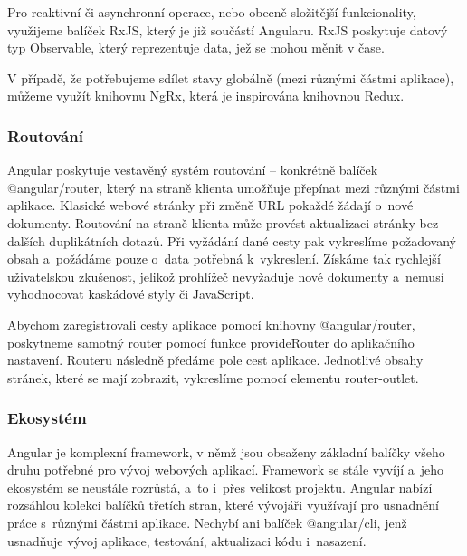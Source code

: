 Pro reaktivní či asynchronní operace, nebo obecně složitější funkcionality, využijeme balíček RxJS, který je již součástí Angularu. 
RxJS poskytuje datový typ Observable, který reprezentuje data, jež se mohou měnit v čase.\cite{angulario,rxjslibrary}

V případě, že potřebujeme sdílet stavy globálně (mezi různými částmi aplikace), můžeme využít knihovnu NgRx, která je inspirována knihovnou Redux.\cite{angularstatemanagement,ngrxlib}

\subsubsection{Routování}

Angular poskytuje vestavěný systém routování -- konkrétně balíček @angular/router, který na straně klienta umožňuje přepínat mezi různými částmi aplikace. 
Klasické webové stránky při změně URL pokaždé žádají o~nové dokumenty. Routování na straně klienta může provést aktualizaci stránky bez dalších duplikátních dotazů. 
Při vyžádání dané cesty pak vykreslíme požadovaný obsah a~požádáme pouze o~data potřebná k~vykreslení. 
Získáme tak rychlejší uživatelskou zkušenost, jelikož prohlížeč nevyžaduje nové dokumenty a~nemusí vyhodnocovat kaskádové styly či JavaScript.

Abychom zaregistrovali cesty aplikace pomocí knihovny @angular/router, poskytneme samotný router pomocí funkce provideRouter do aplikačního nastavení. 
Routeru následně předáme pole cest aplikace. Jednotlivé obsahy stránek, které se mají zobrazit, vykreslíme pomocí elementu router-outlet.\cite{angulardev,learningangular}

\subsubsection{Ekosystém}

Angular je komplexní framework, v němž jsou obsaženy základní balíčky všeho druhu potřebné pro vývoj webových aplikací. 
Framework se stále vyvíjí a~jeho ekosystém se neustále rozrůstá, a~to i~přes velikost projektu. 
Angular nabízí rozsáhlou kolekci balíčků třetích stran, které vývojáři využívají pro usnadnění práce s~různými částmi aplikace. 
Nechybí ani balíček @angular/cli, jenž usnadňuje vývoj aplikace, testování, aktualizaci kódu i~nasazení.\cite{angulardev,learningangular}